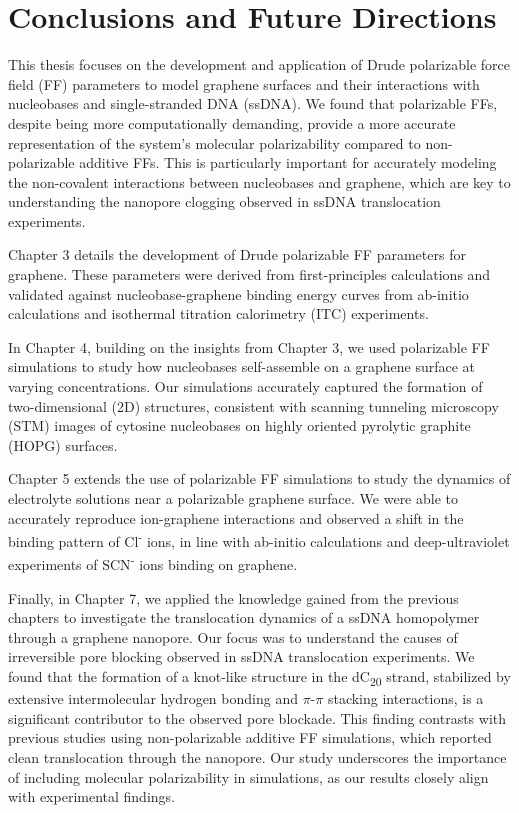 \chapter[Conclusions and Future Directions]{Conclusions and Future Directions}
\justifying
This thesis focuses on the development and application of Drude polarizable force field (FF) parameters to model graphene surfaces and their interactions with nucleobases and single-stranded DNA (ssDNA). We found that polarizable FFs, despite being more computationally demanding, provide a more accurate representation of the system's molecular polarizability compared to non-polarizable additive FFs. This is particularly important for accurately modeling the non-covalent interactions between nucleobases and graphene, which are key to understanding the nanopore clogging observed in ssDNA translocation experiments.

Chapter 3 details the development of Drude polarizable FF parameters for graphene. These parameters were derived from first-principles calculations and validated against nucleobase-graphene binding energy curves from ab-initio calculations and isothermal titration calorimetry (ITC) experiments.

In Chapter 4, building on the insights from Chapter 3, we used polarizable FF simulations to study how nucleobases self-assemble on a graphene surface at varying concentrations. Our simulations accurately captured the formation of two-dimensional (2D) structures, consistent with scanning tunneling microscopy (STM) images of cytosine nucleobases on highly oriented pyrolytic graphite (HOPG) surfaces.

Chapter 5 extends the use of polarizable FF simulations to study the dynamics of electrolyte solutions near a polarizable graphene surface. We were able to accurately reproduce ion-graphene interactions and observed a shift in the binding pattern of Cl\textsuperscript{-} ions, in line with ab-initio calculations and deep-ultraviolet experiments of SCN\textsuperscript{-} ions binding on graphene.

Finally, in Chapter 7, we applied the knowledge gained from the previous chapters to investigate the translocation dynamics of a ssDNA homopolymer through a graphene nanopore. Our focus was to understand the causes of irreversible pore blocking observed in ssDNA translocation experiments. We found that the formation of a knot-like structure in the dC\textsubscript{20} strand, stabilized by extensive intermolecular hydrogen bonding and $\pi$-$\pi$ stacking interactions, is a significant contributor to the observed pore blockade. This finding contrasts with previous studies using non-polarizable additive FF simulations, which reported clean translocation through the nanopore. Our study underscores the importance of including molecular polarizability in simulations, as our results closely align with experimental findings.

